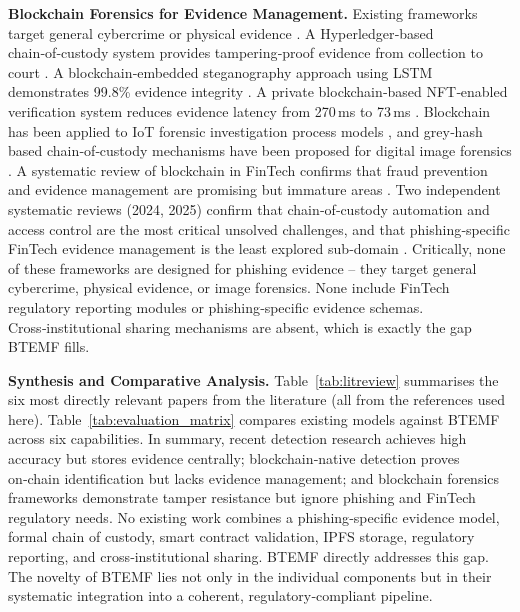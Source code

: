 \documentclass[conference]{IEEEtran}
\begin{document}
\textbf{Blockchain Forensics for Evidence Management.} Existing frameworks target general cybercrime or physical evidence \cite{alves2023}. A Hyperledger‑based chain‑of‑custody system provides tampering‑proof evidence from collection to court \cite{lone2019}. A blockchain‑embedded steganography approach using LSTM demonstrates 99.8\% evidence integrity \cite{faour2024}. A private blockchain‑based NFT‑enabled verification system reduces evidence latency from 270\,ms to 73\,ms \cite{alsubhi2024}. Blockchain has been applied to IoT forensic investigation process models \cite{akinbi2022}, and grey‑hash based chain‑of‑custody mechanisms have been proposed for digital image forensics \cite{ali2022}. A systematic review of blockchain in FinTech confirms that fraud prevention and evidence management are promising but immature areas \cite{anwar2024}. Two independent systematic reviews (2024, 2025) confirm that chain‑of‑custody automation and access control are the most critical unsolved challenges, and that phishing‑specific FinTech evidence management is the least explored sub‑domain \cite{atlam2024, atlam2025}. Critically, none of these frameworks are designed for phishing evidence – they target general cybercrime, physical evidence, or image forensics. None include FinTech regulatory reporting modules or phishing‑specific evidence schemas. Cross‑institutional sharing mechanisms are absent, which is exactly the gap BTEMF fills.

\textbf{Synthesis and Comparative Analysis.} Table~\ref{tab:litreview} summarises the six most directly relevant papers from the literature (all from the references used here). Table~\ref{tab:evaluation_matrix} compares existing models against BTEMF across six capabilities. In summary, recent detection research achieves high accuracy but stores evidence centrally; blockchain‑native detection proves on‑chain identification but lacks evidence management; and blockchain forensics frameworks demonstrate tamper resistance but ignore phishing and FinTech regulatory needs. No existing work combines a phishing‑specific evidence model, formal chain of custody, smart contract validation, IPFS storage, regulatory reporting, and cross‑institutional sharing. BTEMF directly addresses this gap. The novelty of BTEMF lies not only in the individual components but in their systematic integration into a coherent, regulatory‑compliant pipeline.
\end{document}
